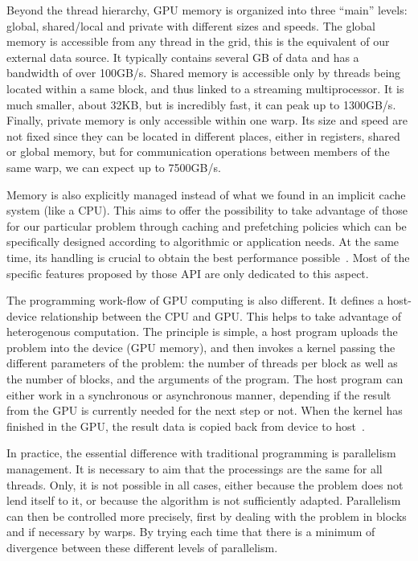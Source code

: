 
Beyond the thread hierarchy, GPU memory is organized into three ``main'' levels: global, shared/local and private with different sizes and speeds. The global memory is accessible from any thread in the grid, this is the equivalent of our external data source. It typically contains several GB of data and has a bandwidth of over 100GB/s. Shared memory is accessible only by threads being located within a same block, and thus linked to a streaming multiprocessor. It is much smaller, about 32KB, but is incredibly fast, it can peak up to 1300GB/s. Finally, private memory is only accessible within one warp. Its size and speed are not fixed since they can be located in different places, either in registers, shared or global memory, but for communication operations between members of the same warp, we can expect up to 7500GB/s.

Memory is also explicitly managed instead of what we found in an implicit cache system (like a CPU). This aims to offer the possibility to take advantage of those for our particular problem through caching and prefetching policies which can be specifically designed according to algorithmic or application needs. At the same time, its handling is crucial to obtain the best performance possible~\cite{ueng2008cuda}. Most of the specific features proposed by those API are only dedicated to this aspect.

The programming work-flow of GPU computing is also different. It defines a host-device relationship between the CPU and GPU. This helps to take advantage of heterogenous computation. The principle is simple, a host program uploads the problem into the device (GPU memory), and then invokes a kernel passing the different parameters of the problem: the number of threads per block as well as the number of blocks, and the arguments of the program. The host program can either work in a synchronous or asynchronous manner, depending if the result from the GPU is currently needed for the next step or not. When the kernel has finished in the GPU, the result data is copied back from device to host~\cite{stone2010opencl}.

In practice, the essential difference with traditional programming is parallelism management. It is necessary to aim that the processings are the same for all threads. Only, it is not possible in all cases, either because the problem does not lend itself to it, or because the algorithm is not sufficiently adapted. Parallelism can then be controlled more precisely, first by dealing with the problem in blocks and if necessary by warps. By trying each time that there is a minimum of divergence between these different levels of parallelism.

